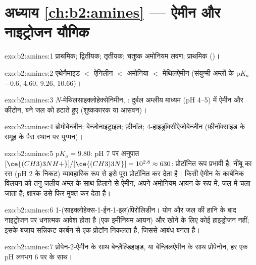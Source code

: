 \section*{अध्याय \ref{ch:b2:amines} --- ऐमीन और नाइट्रोजन यौगिक}

\begin{solution}{exo:b2:amines:1}
प्राथमिक; द्वितीयक; तृतीयक; चतुष्क अमोनियम लवण; प्राथमिक ()।
\end{solution}

\begin{solution}{exo:b2:amines:2}
एथेनैमाइड $<$ ऐनिलीन $<$ अमोनिया $<$ मेथिलऐमीन (संयुग्मी अम्लों के $\mathrm pK_a$
$-0.6$, 4.60, 9.26, 10.66)।
\end{solution}

\begin{solution}{exo:b2:amines:3}
\textit{N}-मेथिलसाइक्लोहेक्सेनिमीन, : दुर्बल अम्लीय माध्यम (pH 4--5) में ऐमीन और कीटोन,
बने जल को हटाते हुए (शुष्ककारक या  आसवन)।
\end{solution}

\begin{solution}{exo:b2:amines:4}
ब्रोमोबेन्ज़ीन; बेन्ज़ोनाइट्राइल; फ़ीनॉल; 4-हाइड्रॉक्सीऐज़ोबेन्ज़ीन  (फ़ीनॉक्साइड के
 समूह के पैरा स्थान पर युग्मन)।
\end{solution}

\begin{solution}{exo:b2:amines:5}
$\mathrm pK_a = 9.80$: pH 7 पर अनुपात $[\ce{(CH3)3NH+}]/[\ce{(CH3)3N}] = 10^{2.8} \approx 630$:
प्रोटॉनित रूप प्रभावी है; नींबू का रस (pH 2 के निकट) व्यावहारिक रूप से इसे पूरा प्रोटॉनित कर देता है। किसी ऐमीन के
कार्बनिक विलयन को तनु जलीय अम्ल के साथ हिलाने से ऐमीन, अपने अमोनियम आयन के रूप में,
जल में चला जाता है; क्षारक उसे फिर मुक्त कर देता है।
\end{solution}

\begin{solution}{exo:b2:amines:6}
1-(साइक्लोहेक्स-1-ईन-1-इल)पिरोलिडीन। योग और जल की हानि के बाद नाइट्रोजन पर
धनात्मक आवेश होता है (एक इमीनियम आयन) और खोने के लिए कोई हाइड्रोजन नहीं; इसके बजाय सन्निकट
कार्बन से एक प्रोटॉन निकलता है, जिससे  आबंध बनता है।
\end{solution}

\begin{solution}{exo:b2:amines:7}
प्रोपेन-2-ऐमीन के साथ बेन्ज़ैल्डिहाइड, या बेन्ज़िलऐमीन के साथ प्रोपेनोन, हर एक pH
लगभग 6 पर  के साथ।
\end{solution}

